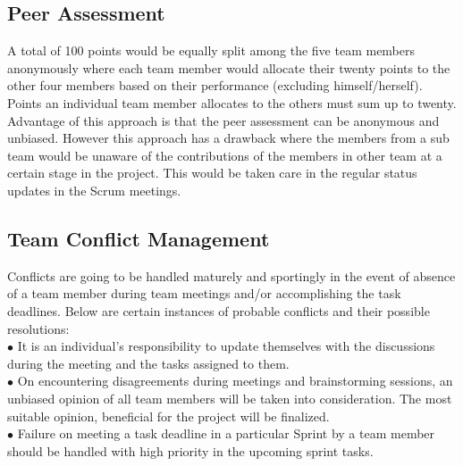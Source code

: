 \documentclass[11pt]{article}
\begin{document}
		\subsection{Peer Assessment}\label{SubSec-PA} A total of 100 points would be equally split among the five team members anonymously where each team member would allocate their twenty points to the other four members based on their performance (excluding himself/herself). Points an individual team member allocates to the others must sum up to twenty. \\
Advantage of this approach is that the peer assessment can be anonymous and unbiased. However this approach has a drawback where the members from a sub team would be unaware of the contributions of the members in other team at a certain stage in the project. This would be taken care in the regular status updates in the Scrum meetings.

		\subsection{Team Conflict Management}\label{SubSec-TCM} Conflicts are going to be handled maturely and sportingly in the event of absence of a team member during team meetings and/or accomplishing the task deadlines. Below are certain instances of probable conflicts and their possible resolutions: \\
		      $\bullet$ It is an individual\rq s responsibility to update themselves with the discussions during the meeting and the tasks assigned to them. \\
			$\bullet$ On encountering disagreements during meetings and brainstorming sessions, an unbiased opinion of all team members will be taken into consideration. The most suitable opinion, beneficial for the project will be finalized. \\
		 	$\bullet$ Failure on meeting a task deadline in a particular Sprint by a team member should be handled with high priority in the upcoming sprint tasks. 



\end{document}
